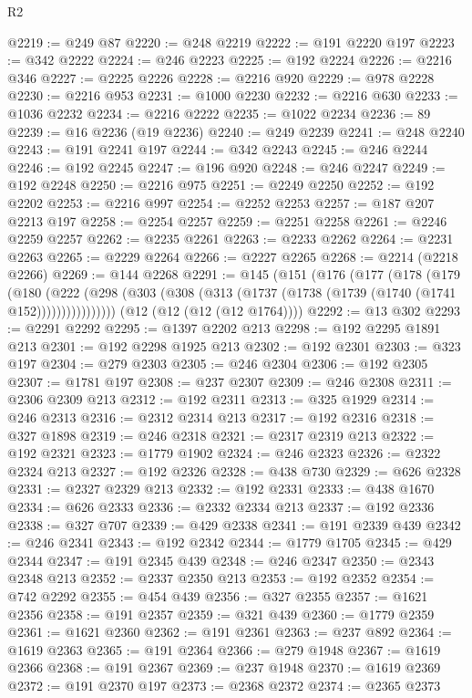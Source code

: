 \begin{lexlean}{R2}
\begin{coremodule}
@2219 := @249 @87
@2220 := @248 @2219
@2222 := @191 @2220 @197
@2223 := @342 @2222
@2224 := @246 @2223
@2225 := @192 @2224
@2226 := @2216 @346
@2227 := @2225 @2226
@2228 := @2216 @920
@2229 := @978 @2228
@2230 := @2216 @953
@2231 := @1000 @2230
@2232 := @2216 @630
@2233 := @1036 @2232
@2234 := @2216 @2222
@2235 := @1022 @2234
@2236 := 89
@2239 := @16 @2236 (@19 @2236)
@2240 := @249 @2239
@2241 := @248 @2240
@2243 := @191 @2241 @197
@2244 := @342 @2243
@2245 := @246 @2244
@2246 := @192 @2245
@2247 := @196 @920
@2248 := @246 @2247
@2249 := @192 @2248
@2250 := @2216 @975
@2251 := @2249 @2250
@2252 := @192 @2202
@2253 := @2216 @997
@2254 := @2252 @2253
@2257 := @187 @207 @2213 @197
@2258 := @2254 @2257
@2259 := @2251 @2258
@2261 := @2246 @2259 @2257
@2262 := @2235 @2261
@2263 := @2233 @2262
@2264 := @2231 @2263
@2265 := @2229 @2264
@2266 := @2227 @2265
@2268 := @2214 (@2218 @2266)
@2269 := @144 @2268
@2291 := @145
    (@151
      (@176
        (@177
          (@178
            (@179
              (@180
                (@222
                  (@298 (@303 (@308 (@313 (@1737 (@1738 (@1739 (@1740 (@1741 @152))))))))))))))))
    (@12 (@12 (@12 (@12 @1764))))
@2292 := @13 @302
@2293 := @2291 @2292
@2295 := @1397 @2202 @213
@2298 := @192 @2295 @1891 @213
@2301 := @192 @2298 @1925 @213
@2302 := @192 @2301
@2303 := @323 @197
@2304 := @279 @2303
@2305 := @246 @2304
@2306 := @192 @2305
@2307 := @1781 @197
@2308 := @237 @2307
@2309 := @246 @2308
@2311 := @2306 @2309 @213
@2312 := @192 @2311
@2313 := @325 @1929
@2314 := @246 @2313
@2316 := @2312 @2314 @213
@2317 := @192 @2316
@2318 := @327 @1898
@2319 := @246 @2318
@2321 := @2317 @2319 @213
@2322 := @192 @2321
@2323 := @1779 @1902
@2324 := @246 @2323
@2326 := @2322 @2324 @213
@2327 := @192 @2326
@2328 := @438 @730
@2329 := @626 @2328
@2331 := @2327 @2329 @213
@2332 := @192 @2331
@2333 := @438 @1670
@2334 := @626 @2333
@2336 := @2332 @2334 @213
@2337 := @192 @2336
@2338 := @327 @707
@2339 := @429 @2338
@2341 := @191 @2339 @439
@2342 := @246 @2341
@2343 := @192 @2342
@2344 := @1779 @1705
@2345 := @429 @2344
@2347 := @191 @2345 @439
@2348 := @246 @2347
@2350 := @2343 @2348 @213
@2352 := @2337 @2350 @213
@2353 := @192 @2352
@2354 := @742 @2292
@2355 := @454 @439
@2356 := @327 @2355
@2357 := @1621 @2356
@2358 := @191 @2357
@2359 := @321 @439
@2360 := @1779 @2359
@2361 := @1621 @2360
@2362 := @191 @2361
@2363 := @237 @892
@2364 := @1619 @2363
@2365 := @191 @2364
@2366 := @279 @1948
@2367 := @1619 @2366
@2368 := @191 @2367
@2369 := @237 @1948
@2370 := @1619 @2369
@2372 := @191 @2370 @197
@2373 := @2368 @2372
@2374 := @2365 @2373

\end{coremodule}
\end{lexlean}
